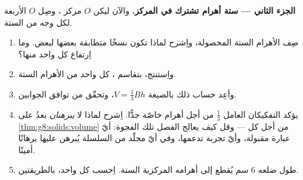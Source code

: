 \begin{problem}
\medskip
\noindent\textbf{الجزء الثاني --- ستة أهرام تشترك في المركز.}
والآن ليكن $O$ مركز ، وصِل $O$  الأربعة
لكل وجه من  الستة.
\begin{enumerate}[resume]
  \item صِف الأهرام الستة المحصولة، واِشرح لماذا تكون
        نسخًا متطابقة بعضها لبعض. وما اِرتفاع
        كل واحد منها؟
  \item واِستنتج، بتقاسم  ،  كل واحد
        من الأهرام الستة.
  \item وأعِد حساب ذلك  بالصيغة
        $V = \frac13 B h$، وتحقّق من توافق الجوابين.
  \item يؤكد التفكيكان العامل $\frac13$ من أجل
        أهرام خاصّة جدًّا. اِشرح لماذا لا \emph{يبرهنان} بعدُ
        على \cref{thm:g8:solids:volume} من أجل كل
          --- وقل كيف يعالج الفصل
        تلك الفجوة: أيّ عبارة مقبولة، وأيّ تجربة
        تدعمها، وفي أيّ مجلّد من السلسلة يُبرهن
        عليها برهانًا أمينًا.
  \item {} طول ضلعه $6$ سم يُقطع إلى أهرامه المركزية
        الستة. اِحسب  كل واحد، بالطريقتين.
\end{enumerate}


\end{problem}
